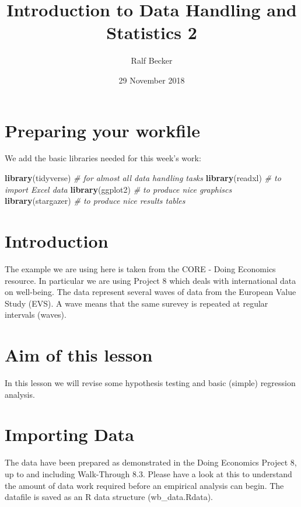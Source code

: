 \documentclass[]{article}
\title{Introduction to Data Handling and Statistics 2}
\author{Ralf Becker}
\date{29 November 2018}
\newenvironment{Shaded}{\begin{snugshade}}{\end{snugshade}}
\newcommand{\KeywordTok}[1]{\textcolor[rgb]{0.13,0.29,0.53}{\textbf{#1}}}
\newcommand{\CommentTok}[1]{\textcolor[rgb]{0.56,0.35,0.01}{\textit{#1}}}
\newcommand{\NormalTok}[1]{#1}
\begin{document}
\maketitle

\section{Preparing your workfile}\label{preparing-your-workfile}

We add the basic libraries needed for this week's work:

\begin{Shaded}
\begin{Highlighting}[]
\KeywordTok{library}\NormalTok{(tidyverse)    }\CommentTok{# for almost all data handling tasks}
\KeywordTok{library}\NormalTok{(readxl)       }\CommentTok{# to import Excel data}
\KeywordTok{library}\NormalTok{(ggplot2)      }\CommentTok{# to produce nice graphiscs}
\KeywordTok{library}\NormalTok{(stargazer)    }\CommentTok{# to produce nice results tables}
\end{Highlighting}
\end{Shaded}

\section{Introduction}\label{introduction}

The example we are using here is taken from the CORE - Doing Economics
resource. In particular we are using Project 8 which deals with
international data on well-being. The data represent several waves of
data from the European Value Study (EVS). A wave means that the same
surevey is repeated at regular intervals (waves).

\section{Aim of this lesson}\label{aim-of-this-lesson}

In this lesson we will revise some hypothesis testing and basic (simple)
regression analysis.

\section{Importing Data}\label{importing-data}

The data have been prepared as demonstrated in the Doing Economics
Project 8, up to and including Walk-Through 8.3. Please have a look at
this to understand the amount of data work required before an empirical
analysis can begin. The datafile is saved as an R data structure
(wb\_data.Rdata).
\end{document}
